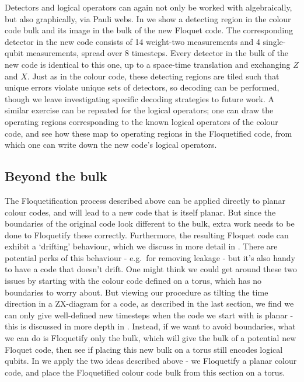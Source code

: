 Detectors and logical operators can again not only be worked with algebraically,
but also graphically, via Pauli webs.
In  we show a detecting region in the colour code bulk and its image in the bulk of the new Floquet code.
The corresponding detector in the new code consists of 14 weight-two measurements and 4 single-qubit measurements, spread over 8 timesteps.
Every detector in the bulk of the new code is identical to this one,
up to a space-time translation and exchanging $Z$ and $X$.
Just as in the colour code, these detecting regions are tiled such that unique errors
violate unique sets of detectors, so decoding can be performed,
though we leave investigating specific decoding strategies to future work.
A similar exercise can be repeated for the logical operators;
one can draw the operating regions corresponding to the known logical operators of the colour code,
and see how these map to operating regions in the Floquetified code,
from which one can write down the new code's logical operators.

\subsection{Beyond the bulk}\label{subsec:floquetifying_colour_code_beyond_bulk}

The Floquetification process described above can be applied directly to planar colour codes,
and will lead to a new code that is itself planar.
But since the boundaries of the original code look different to the bulk,
extra work needs to be done to Floquetify these correctly.
Furthermore, the resulting Floquet code can exhibit a `drifting' behaviour,
which we discuss in more detail in .
There are potential perks of this behaviour - e.g.\ for removing leakage -
but it's also handy to have a code that doesn't drift.
One might think we could get around these two issues by starting with the colour code defined on a torus,
which has no boundaries to worry about.
But viewing our procedure as tilting the time direction in a ZX-diagram for a code,
as described in the last section,
we find we can only give well-defined new timesteps when the code we start with is planar -
this is discussed in more depth in .
Instead, if we want to avoid boundaries,
what we can do is Floquetify only the bulk,
which will give the bulk of a potential new Floquet code,
then see if placing this new bulk on a torus still encodes logical qubits.
In  we apply the two ideas described above -
we Floquetify a planar colour code,
and place the Floquetified colour code bulk from this section on a torus.
